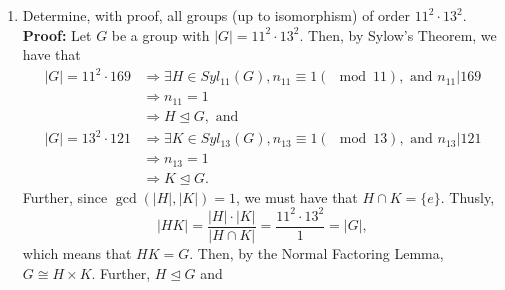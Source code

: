 \documentclass{article}
\begin{document}
\begin{enumerate}
\begin{enumerate}
        Now, let $x,y \in G$. Then we can consider their cosets $xZ(G)$ and $yZ(G)$, both in $\sfrac{G}{Z(G)}$. Then we can write both of these 
        as powers of their generators. We ahve $xZ(G) = g^aZ(G)$ and $yZ(G) = g^bZ(G)$. Then we write $x$ and $y$ as $x=g^az_1$ and $y=g^bz_2$. 
        Then we have
        \begin{align*}
            xy &= (g^az_1)(g^bz_2) \\
            &= g^a(z_1g^b)z_2 \\
            &= g^a(g^bz_1)z_2 \\
            &= (g^ag^b)(z_1z_2) \\
            &= g^{a+b}(z_2z_1) \\
            &= g^{b+a}(z_2z_1) \\
            &= g^b(g^az_2)z_1 \\
            &= g^b(z_2g^a)z_1 \\
            &= (g^bz_2)(g^az_1) \\
            &= yx \\
            &\Longrightarrow G \text{ is abelian. } \square 
        \end{align*}
        \item Determine, with proof, all groups (up to isomorphism) of order $11^2 \cdot 13^2$.\\
        \textbf{Proof:} Let $G$ be a group with $|G| = 11^2 \cdot 13^2$. Then, by Sylow's Theorem, we have that 
        \begin{align*}
            |G| = 11^2 \cdot 169 &\Longrightarrow \exists H \in Syl_{11}(G), n_{11} \equiv 1(\mod{11}), \text{ and } n_{11} \big| 169 \\
            &\Longrightarrow n_{11}=1 \\
            &\Longrightarrow H \trianglelefteq G, \text{ and } \\
            |G| = 13^2 \cdot 121 &\Longrightarrow \exists K \in Syl_{13}(G), n_{13} \equiv 1(\mod{13}), \text{ and } n_{13} \big| 121 \\
            &\Longrightarrow n_{13} = 1 \\
            &\Longrightarrow K \trianglelefteq G.
        \end{align*}
        Further, since $\gcd{(|H|,|K|)} = 1$, we must have that $H \cap K = \{e\}$. Thusly, 
        \[
            |HK| = \dfrac{|H| \cdot |K|}{|H \cap K|} = \dfrac{11^2 \cdot 13^2}{1} = |G|,
        \]
        which means that $HK = G$. Then, by the Normal Factoring Lemma, $G \cong H \times K$. Further, $H \trianglelefteq G$ and 

\end{enumerate}
\end{enumerate}
\end{document}
